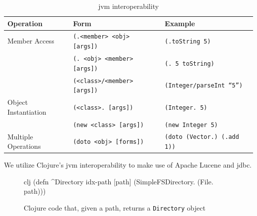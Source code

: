 			\begin{table}
				\centering
				
				\begin{tabular}{lll}
					\toprule
					Operation & Form & Example \\
					\midrule
					Member Access & \texttt{(.<member> <obj> [args])} & \texttt{(.toString 5)} \\
					 & \texttt{(. <obj> <member> [args])} & \texttt{(. 5 toString)} \\
					 & \texttt{(<class>/<member> [args])} & \texttt{(Integer/parseInt ``5'')} \\
					Object Instantiation & \texttt{(<class>. [args])} & \texttt{(Integer. 5)} \\
					 & \texttt{(new <class> [args])} & \texttt{(new Integer 5)} \\
					Multiple Operations & \texttt{(doto <obj> [forms])} & \texttt{(doto (Vector.) (.add 1))} \\
					\bottomrule
				\end{tabular}
				
				\caption{\gls{jvm} interoperability}
				\label{tbl:jvm-interop-syntax}
			\end{table}
			
			We utilize Clojure's \gls{jvm} interoperability to make use of Apache Lucene and \gls{jdbc}.
			
			\begin{figure}
				\begin{singlespaced}
					\begin{pygments}{clj}
(defn ^Directory idx-path
  [path]
  (SimpleFSDirectory. (File. path)))
					\end{pygments}
				\end{singlespaced}
				
				\caption{Clojure code that, given a path, returns a \texttt{Directory} object}
			\end{figure}